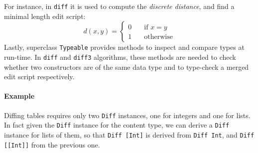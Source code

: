 \documentclass{sigplanconf}
\theoremstyle{plain}
\newtheorem{definition}{Definition}
\begin{document}

For instance, in \texttt{diff} it is used to compute the
\emph{discrete distance}, and find a minimal length edit script:
	\[ d(x, y) = 
		\begin{cases} 
			0 \quad &\mbox{if } x = y \\
			1 \quad &\mbox {otherwise}		
		\end{cases} \]	
%
Lastly, superclass \texttt{Typeable} provides methods to inspect
and compare types at run-time.
%
In \texttt{diff} and \texttt{diff3} algorithms, these methods are
needed to check whether two constructors are of the same data type and
to type-check a merged edit script respectively.

\paragraph{Example}
Diffing tables requires only two \texttt{Diff} instances, one for
integers and one for lists.
%
In fact given the \texttt{Diff} instance for the content type, we can
derive a \texttt{Diff} instance for lists of them, so that
\texttt{Diff [Int]} is derived from \texttt{Diff Int}, and
\texttt{Diff [[Int]]} from the previous one.
\end{document}
